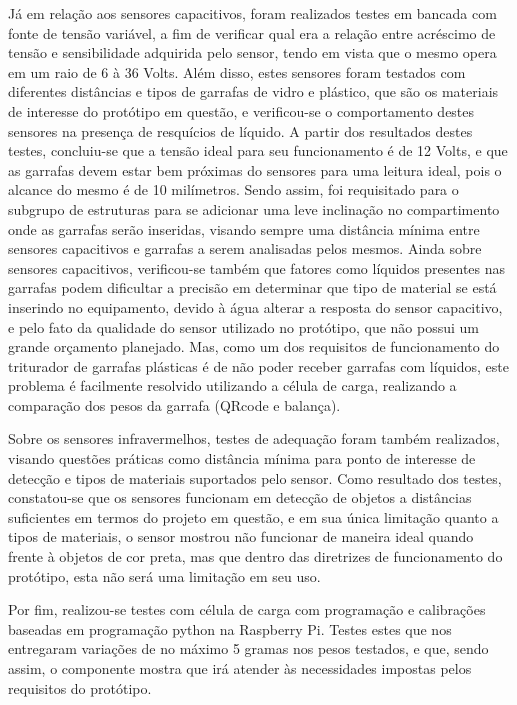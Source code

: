 Já em relação aos sensores capacitivos, foram realizados testes em bancada com fonte de tensão variável, a fim de verificar qual era a relação entre acréscimo de tensão e sensibilidade adquirida pelo sensor, tendo em vista que o mesmo opera em um raio de 6 à 36 Volts. Além disso, estes sensores foram testados com diferentes distâncias e tipos de garrafas de vidro e plástico, que são os materiais de interesse do protótipo em questão, e verificou-se o comportamento destes sensores na presença de resquícios de líquido. A partir dos resultados destes testes, concluiu-se que a tensão ideal para seu funcionamento é de 12 Volts, e que as garrafas devem estar bem próximas do sensores para uma leitura ideal, pois o alcance do mesmo é de 10 milímetros. Sendo assim, foi requisitado para o subgrupo de estruturas para se adicionar uma leve inclinação no compartimento onde as garrafas serão inseridas, visando sempre uma distância mínima entre sensores capacitivos e garrafas a serem analisadas pelos mesmos. 
Ainda sobre sensores capacitivos, verificou-se também que fatores como líquidos presentes nas garrafas podem dificultar a precisão em determinar que tipo de material se está inserindo no equipamento, devido à água alterar a resposta do sensor capacitivo, e pelo fato da qualidade do sensor utilizado no protótipo, que não possui um grande orçamento planejado. Mas, como um dos requisitos de funcionamento do triturador de garrafas plásticas é de não poder receber garrafas com líquidos, este problema é facilmente resolvido utilizando a célula de carga, realizando a comparação dos pesos da garrafa (QRcode e balança).

Sobre os sensores infravermelhos, testes de adequação foram também realizados, visando questões práticas como distância mínima para ponto de interesse de detecção e tipos de materiais suportados pelo sensor. Como resultado dos testes, constatou-se que os sensores funcionam em detecção de objetos a distâncias suficientes em termos do projeto em questão, e em sua única limitação quanto a tipos de materiais, o sensor mostrou não funcionar de maneira ideal quando frente à objetos de cor preta, mas que dentro das diretrizes de funcionamento do protótipo, esta não será uma limitação em seu uso.

Por fim, realizou-se testes com célula de carga com programação e calibrações baseadas em programação python na Raspberry Pi. Testes estes que nos entregaram variações de no máximo 5 gramas nos pesos testados, e que, sendo assim, o componente mostra que irá atender às necessidades impostas pelos requisitos do protótipo.


